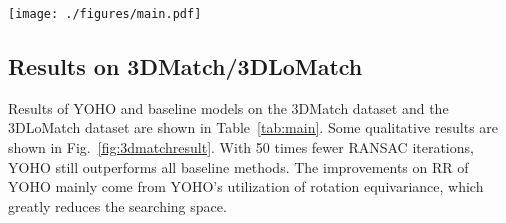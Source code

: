 \begin{figure*}
\begin{center}
\texttt{[image: ./figures/main.pdf]}
\end{center}
\vspace{-10pt}
\caption{(Left) Qualitative comparison with baselines. (Right) Completed scenes by YOHO and some input partial scans.}
\label{fig:3dmatchresult}
\vspace{-5pt}
\end{figure*}

\subsection{Results on 3DMatch/3DLoMatch}
Results of YOHO and baseline models on the 3DMatch dataset and the 3DLoMatch dataset are shown in Table~\ref{tab:main}. Some qualitative results are shown in Fig.~\ref{fig:3dmatchresult}.
With 50 times fewer RANSAC iterations, YOHO still outperforms all baseline methods. 
The improvements on RR of YOHO mainly come from YOHO's utilization of rotation equivariance, which greatly reduces the searching space. 

